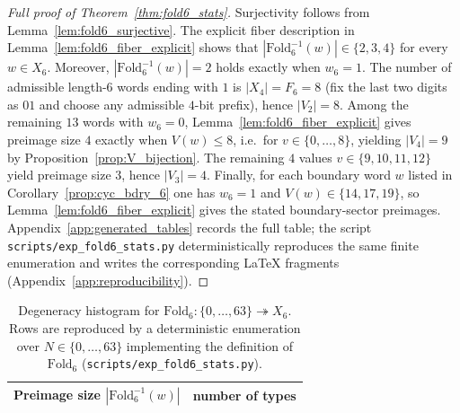\begin{proof}[Full proof of Theorem~\ref{thm:fold6_stats}]
Surjectivity follows from Lemma~\ref{lem:fold6_surjective}.
The explicit fiber description in Lemma~\ref{lem:fold6_fiber_explicit} shows that $|\mathrm{Fold}_6^{-1}(w)|\in\{2,3,4\}$ for every $w\in X_6$.
Moreover, $|\mathrm{Fold}_6^{-1}(w)|=2$ holds exactly when $w_6=1$.
The number of admissible length-$6$ words ending with $1$ is $|X_4|=F_6=8$ (fix the last two digits as $01$ and choose any admissible $4$-bit prefix), hence $|V_2|=8$.
Among the remaining $13$ words with $w_6=0$, Lemma~\ref{lem:fold6_fiber_explicit} gives preimage size $4$ exactly when $V(w)\le 8$, i.e.\ for $v\in\{0,\dots,8\}$, yielding $|V_4|=9$ by Proposition~\ref{prop:V_bijection}.
The remaining $4$ values $v\in\{9,10,11,12\}$ yield preimage size $3$, hence $|V_3|=4$.
Finally, for each boundary word $w$ listed in Corollary~\ref{prop:cyc_bdry_6} one has $w_6=1$ and $V(w)\in\{14,17,19\}$, so Lemma~\ref{lem:fold6_fiber_explicit} gives the stated boundary-sector preimages.
Appendix~\ref{app:generated_tables} records the full table; the script
\texttt{scripts/exp\_fold6\_stats.py} deterministically reproduces the same finite enumeration and writes the corresponding \LaTeX{} fragments (Appendix~\ref{app:reproducibility}).
\end{proof}

\begin{table}[H]
\centering
\small
\setlength{\tabcolsep}{10pt}
\renewcommand{\arraystretch}{1.15}
\begin{tabular}{rr}
\toprule
Preimage size $|\mathrm{Fold}_6^{-1}(w)|$ & number of types \\
\midrule

\end{tabular}
\caption{Degeneracy histogram for $\mathrm{Fold}_6:\{0,\dots,63\}\twoheadrightarrow X_6$.
Rows are reproduced by a deterministic enumeration over $N\in\{0,\dots,63\}$ implementing the definition of $\mathrm{Fold}_6$ (\texttt{scripts/exp\_fold6\_stats.py}).}
\label{tab:fold6_degeneracy}
\end{table}


